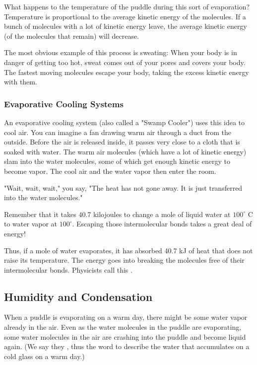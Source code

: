 What happens to the temperature of the puddle during this sort of evaporation? Temperature is proportional to the average kinetic energy of the molecules. If a bunch of molecules with a lot of kinetic energy leave, the average kinetic energy (of the molecules that remain) will decrease.

The most obvious example of this process is sweating: When your body is in danger of getting too hot, sweat comes out of your pores and covers your body. The fastest moving molecules escape your body, taking the excess kinetic energy with them.

\subsubsection{Evaporative Cooling Systems}

An evaporative cooling system (also called a "Swamp Cooler") uses this idea to cool air. You can imagine a fan drawing warm air through a duct from the outside.  Before the air is released inside, it passes very close to a cloth that is soaked with water.  The warm air molecules (which have a lot of kinetic energy) slam into the water molecules, some of which get enough kinetic energy to become vapor. The cool air and the water vapor then enter the room.

"Wait, wait, wait," you say, "The heat has not gone away. It is just transferred into the water molecules."

Remember that it takes 40.7 kilojoules to change a mole of liquid water at $100^\circ$ C to water vapor at $100^\circ$. Escaping those intermolecular bonds takes a great deal of energy!

Thus, if a mole of water evaporates, it has absorbed 40.7 kJ of heat that does not raise its temperature. The energy goes into breaking the molecules free of their intermolecular bonds. Physicists call this .
 
 \subsection{Humidity and Condensation}
 
When a puddle is evaporating on a warm day, there might be some water vapor already in the air. Even as the water molecules in the puddle are evaporating, some water molecules in the air are crashing into the puddle and become liquid again. (We say they , thus the word  to describe the water that accumulates on a cold glass on a warm day.)
 
